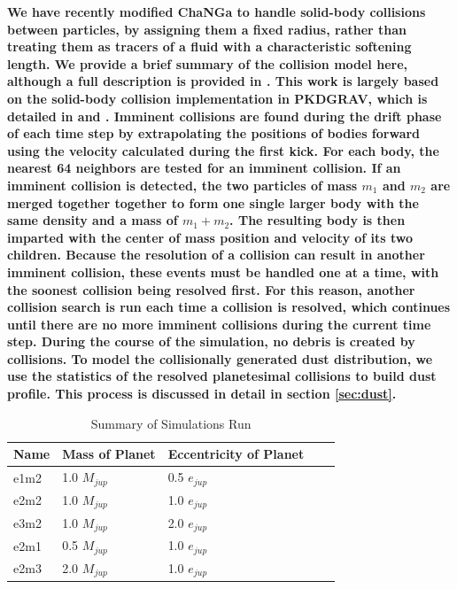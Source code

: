 \documentclass[fleqn,usenatbib]{mnras}
\begin{document}
\textbf{We have recently modified {\sc ChaNGa} to handle solid-body collisions between particles, by assigning them a fixed radius, rather than treating them as tracers of a fluid with a 
characteristic softening length. We provide a brief summary of the collision model here, although a full description is provided in \citet{2019MNRAS.489.2159W}. This work is largely based 
on the solid-body collision implementation in {\sc PKDGRAV}, which is detailed in \citet{1994MNRAS.269..493R} and \citet{2000Icar..143...45R}. Imminent collisions are found during the 
drift phase of each time step by extrapolating the positions of bodies forward using the velocity calculated during the first kick. For each body, the nearest 64 neighbors are tested for an 
imminent collision. If an imminent collision is detected, the two particles of mass $m_{1}$ and $m_{2}$ are merged together together to form one single larger body with the same density 
and a mass of $m_{1} + m_{2}$. The resulting body is then imparted with the center of mass position and velocity of its two children. Because the resolution of a collision can result in 
another imminent collision, these events must be handled one at a time, with the soonest collision being resolved first. For this reason, another collision search is run each time a collision 
is resolved, which continues until there are no more imminent collisions during the current time step. During the course of the simulation, no debris is created by collisions. To model the 
collisionally generated dust distribution, we use the statistics of the resolved planetesimal collisions to build dust profile. This process is discussed in detail in section \ref{sec:dust}.}

\begin{table}
\begin{center}
\caption{Summary of Simulations Run}
\begin{tabular}{lllll} \hline \hline
Name     & Mass of Planet & Eccentricity of Planet &  &  \\ \hline
e1m2 & 1.0 $M_{jup}$                     & 0.5 $e_{jup}$                            &  &  \\
e2m2      & 1.0 $M_{jup}$                     & 1.0 $e_{jup}$                             &  &  \\
e3m2 & 1.0 $M_{jup}$                     & 2.0 $e_{jup}$                             &  &  \\
e2m1 & 0.5 $M_{jup}$                   & 1.0 $e_{jup}$                             &  &  \\
e2m3 & 2.0 $M_{jup}$                     & 1.0 $e_{jup}$                             &  &  \\ \hline
\end{tabular}
\label{tab:sims}
\end{center}
\end{table}
\end{document}
